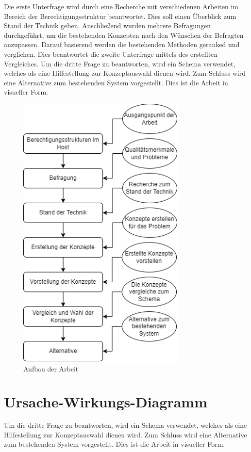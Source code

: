 Die erste Unterfrage wird durch eine Recherche mit verschiedenen Arbeiten im Bereich der Berechtigungsstruktur beantwortet.
Dies soll einen Überblick zum Stand der Technik geben.
Anschließend wurden mehrere Befragungen durchgeführt, um die bestehenden Konzepten nach den Wünschen der Befragten anzupassen.
Darauf basierend werden die bestehenden Methoden geranked und verglichen.
Dies beantwortet die zweite Unterfrage mittels des erstellten Vergleiches.
\newline
Um die dritte Frage zu beantworten, wird ein Schema verwendet, welches als eine Hilfestellung zur Konzeptauswahl dienen wird.
Zum Schluss wird eine Alternative zum bestehenden System vorgestellt.
Dies ist die Arbeit in visueller Form.
\newpage
\begin{figure}[h!]
 \centering
 \includegraphics[width=0.75\textwidth]{gfx/Picture/Vorgehen.PNG}
 \caption{Aufbau der Arbeit}
 \label{fig:vorgehen}
\end{figure}
\newpage
\section{Ursache-Wirkungs-Diagramm}
\label{sec:intro:UWD}
Um die dritte Frage zu beantworten, wird ein Schema verwendet, welches als eine Hilfestellung zur Konzeptauswahl dienen wird.
Zum Schluss wird eine Alternative zum bestehenden System vorgestellt.
Dies ist die Arbeit in visueller Form.